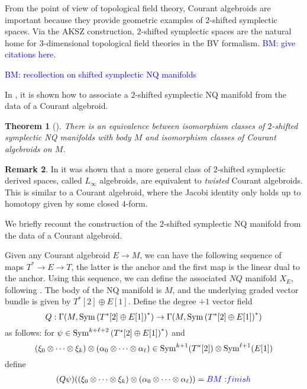 \documentclass{article}
\newtheorem{theorem}{Theorem}[section]
\theoremstyle{definition}
\newtheorem{remark}[theorem]{Remark}
\theoremstyle{remark}
\def\brian{\textcolor{blue}{BM: }\textcolor{blue}}
\begin{document}
From the point of view of topological field theory, Courant algebroids are important because they provide geometric examples of $2$-shifted symplectic spaces. 
Via the AKSZ construction, $2$-shifted symplectic spaces are the natural home for $3$-dimensional topological field theories in the BV formalism. 
\brian{give citations here.}

\brian{recollection on shifted symplectic NQ manifolds}

In \cite{Roytenberg:2002nu}, it is shown how to associate a $2$-shifted symplectic NQ manifold from the data of a Courant algebroid. 

\begin{theorem}[\cite{Roytenberg:2002nu}]
There is an equivalence between isomorphism classes of $2$-shifted symplectic NQ manifolds with body $M$ and isomorphism classes of Courant algebroids on $M$.
\end{theorem}

\begin{remark}
In \cite{PymSafronov} it was shown that a more general class of $2$-shifted symplectic derived spaces, called $L_\infty$ algebroids, are equivalent to {\em twisted} Courant algebroids. 
This is similar to a Courant algebroid, where the Jacobi identity only holds up to homotopy given by some closed $4$-form. 
\end{remark}

We briefly recount the construction of the $2$-shifted symplectic NQ manifold from the data of a Courant algebroid. 

\def\Sym{{\rm Sym}}

Given any Courant algebroid $E \to M$, we can have the following sequence of maps $T^* \to E \to T$, the latter is the anchor and the first map is the linear dual to the anchor.
Using this sequence, we can define the associated $NQ$ manifold $X_E$, following \cite{Ryotenberg:2002nu}.
The body of the NQ manifold is $M$, and the underlying graded vector bundle is given by $T^*[2] \oplus E[1]$. 
Define the degree $+1$ vector field 
\[
Q : \Gamma(M , \Sym \left(T^*[2] \oplus E[1]\right)^*) \to \Gamma(M , \Sym \left(T^*[2] \oplus E[1]\right)^*) 
\]
as follows: for $\psi \in \Sym^{k + \ell + 2} \left(T^*[2] \oplus E[1]\right)^*)$ and
\[
(\xi_0 \otimes \cdots \otimes \xi_k) \otimes (\alpha_0 \otimes \cdots \otimes \alpha_\ell) \in \Sym^{k+1}(T^*[2]) \otimes \Sym^{\ell + 1}(E[1]) 
\]
define
\begin{align*}
(Q \psi) ((\xi_0 \otimes \cdots \otimes \xi_k) \otimes (\alpha_0 \otimes \cdots \otimes \alpha_\ell)) = \brian{finish}
\end{align*}
\end{document}

